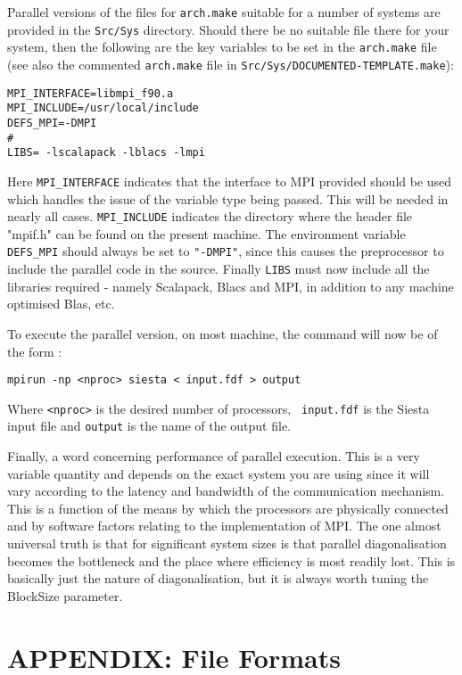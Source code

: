 \documentclass[11pt]{article}
\begin{document}
\noindent
Parallel versions of the files for {\tt arch.make} suitable for a
number of systems are provided in the {\tt Src/Sys} directory. Should
there be no suitable file there for your system, then the following
are the key variables to be set in the {\tt arch.make} file (see also
the commented {\tt arch.make} file in {\tt Src/Sys/DOCUMENTED-TEMPLATE.make}):

\begin{verbatim}
MPI_INTERFACE=libmpi_f90.a
MPI_INCLUDE=/usr/local/include
DEFS_MPI=-DMPI
#
LIBS= -lscalapack -lblacs -lmpi
\end{verbatim}

Here {\tt MPI\_INTERFACE} indicates that the interface to MPI provided
should be used which handles the issue of the variable type being
passed. This will be needed in nearly all cases. {\tt MPI\_INCLUDE}
indicates the directory where the header file "mpif.h" can be found on
the present machine. The environment variable {\tt DEFS\_MPI} should always
be set to {\tt "-DMPI"}, since this causes the preprocessor to include the
parallel code in the source. Finally {\tt LIBS} must now include all the
libraries required - namely Scalapack, Blacs and MPI, in addition to
any machine optimised Blas, etc.

To execute the parallel version, on most machine, the command will now
be of the form :

{\tt mpirun -np <nproc> siesta < input.fdf > output}

Where {\tt <nproc>} is the desired number of processors, {\tt
input.fdf} is the {\sc Siesta} input file and {\tt output} is the name
of the output file.

Finally, a word concerning performance of parallel execution. This is
a very variable quantity and depends on the exact system you are using
since it will vary according to the latency and bandwidth of the
communication mechanism.  This is a function of the means by which the
processors are physically connected and by software factors relating
to the implementation of MPI. The one almost universal truth is that
for significant system sizes is that parallel diagonalisation becomes
the bottleneck and the place where efficiency is most readily
lost. This is basically just the nature of diagonalisation, but it is
always worth tuning the BlockSize parameter.

\newpage
\section{APPENDIX: File Formats}
\end{document}
